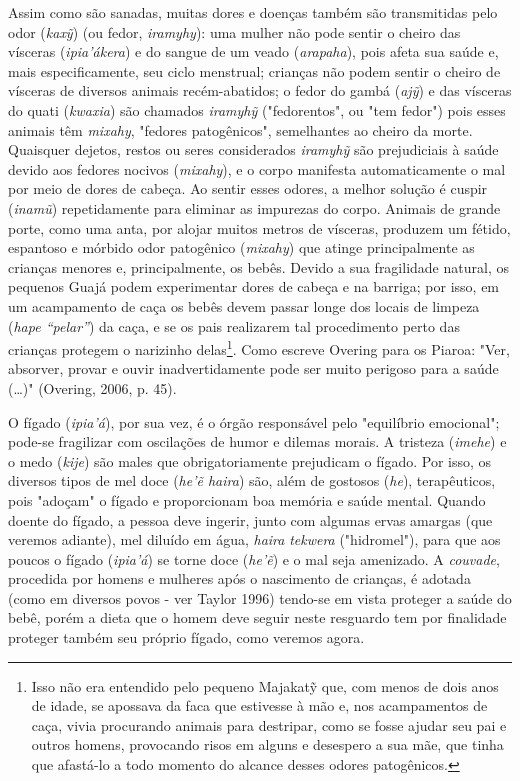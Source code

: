 Assim como são sanadas, muitas dores e doenças também são transmitidas
pelo odor (\emph{kaxỹ}) (ou fedor, \emph{iramyhy}): uma mulher não pode
sentir o cheiro das vísceras (\emph{ipia'ákera}) e do sangue de um veado
(\emph{arapaha}), pois afeta sua saúde e, mais especificamente, seu
ciclo menstrual; crianças não podem sentir o cheiro de vísceras de
diversos animais recém-abatidos; o fedor do gambá (\emph{ajỹ}) e das
vísceras do quati (\emph{kwaxia}) são chamados \emph{iramyhỹ}
("fedorentos", ou "tem fedor") pois esses animais têm \emph{mixahy},
"fedores patogênicos", semelhantes ao cheiro da morte. Quaisquer
dejetos, restos ou seres considerados \emph{iramyhỹ} são prejudiciais à
saúde devido aos fedores nocivos (\emph{mixahy}), e o corpo manifesta
automaticamente o mal por meio de dores de cabeça. Ao sentir esses
odores, a melhor solução é cuspir (\emph{inamũ}) repetidamente para
eliminar as impurezas do corpo. Animais de grande porte, como uma anta,
por alojar muitos metros de vísceras, produzem um fétido, espantoso e
mórbido odor patogênico (\emph{mixahy}) que atinge principalmente as
crianças menores e, principalmente, os bebês. Devido a sua fragilidade
natural, os pequenos Guajá podem experimentar dores de cabeça e na
barriga; por isso, em um acampamento de caça os bebês devem passar longe
dos locais de limpeza (\emph{hape ``pelar''}) da caça, e se os pais
realizarem tal procedimento perto das crianças protegem o narizinho
delas\footnote{Isso não era entendido pelo pequeno Majakatỹ que, com
  menos de dois anos de idade, se apossava da faca que estivesse à mão
  e, nos acampamentos de caça, vivia procurando animais para destripar,
  como se fosse ajudar seu pai e outros homens, provocando risos em
  alguns e desespero a sua mãe, que tinha que afastá-lo a todo momento
  do alcance desses odores patogênicos.}. Como escreve Overing para os
Piaroa: "Ver, absorver, provar e ouvir inadvertidamente pode ser muito
perigoso para a saúde (\ldots{})" (Overing, 2006, p. 45).

O fígado (\emph{ipia'á}), por sua vez, é o órgão responsável pelo
"equilíbrio emocional"; pode-se fragilizar com oscilações de humor e
dilemas morais. A tristeza (\emph{imehe}) e o medo (\emph{kije}) são
males que obrigatoriamente prejudicam o fígado. Por isso, os diversos
tipos de mel doce (\emph{he'ẽ haira}) são, além de gostosos (\emph{he}),
terapêuticos, pois "adoçam" o fígado e proporcionam boa memória e saúde
mental. Quando doente do fígado, a pessoa deve ingerir, junto com
algumas ervas amargas (que veremos adiante), mel diluído em água,
\emph{haira} \emph{tekwera} ("hidromel"), para que aos poucos o fígado
(\emph{ipia'á}) se torne doce (\emph{he'ẽ}) e o mal seja amenizado. A
\emph{couvade}, procedida por homens e mulheres após o nascimento de
crianças, é adotada (como em diversos povos - ver Taylor 1996) tendo-se
em vista proteger a saúde do bebê, porém a dieta que o homem deve seguir
neste resguardo tem por finalidade proteger também seu próprio fígado,
como veremos agora.


